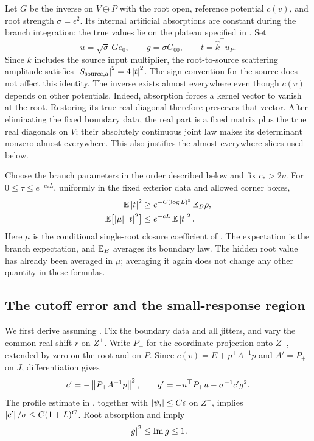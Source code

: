 Let $G$ be the inverse on $V\oplus P$ with the root open, reference
potential $c(v)$, and root strength $\sigma=\epsilon^2$. Its internal
artificial absorptions are constant during the branch integration:
the true values lie on the plateau specified in .
Set
\begin{equation}
 u=\sqrt\sigma\,Ge_0,\qquad g=\sigma G_{00},\qquad
 t=\widehat k^\top u_P.
 \label{trans:amplitude}
\end{equation}
Since $k$ includes the source input multiplier, the root-to-source
scattering amplitude satisfies $\left\lvert S_{\mathrm{source},a}\right\rvert^2=4\left\lvert t\right\rvert^2$.
The sign convention for the source does not affect this identity.
The inverse exists almost everywhere even though $c(v)$ depends on
other potentials. Indeed,
absorption forces a kernel vector to vanish at the root. Restoring its
true real diagonal therefore preserves that vector. After eliminating
the fixed boundary data, the real part is a fixed matrix plus the true
real diagonals on $V$; their absolutely continuous joint law makes its
determinant nonzero almost everywhere. This also justifies the
almost-everywhere slices used below.

\begin{proposition}\label{trans:cell}
Choose the branch parameters in the order described below and fix
$c_*>2\nu$. For $0\le\tau\le e^{-c_*L}$, uniformly in the fixed exterior
data and allowed corner boxes,
\begin{align}
 \mathbb E\left\lvert t\right\rvert^2
 &\ge e^{-C(\log L)^2}\,\mathbb E_B\rho,
 \label{trans:lower}\\
 \mathbb E\bigl[\left\lvert\mu\right\rvert\,\left\lvert t\right\rvert^2\bigr]
 &\le e^{-cL}\,\mathbb E\left\lvert t\right\rvert^2.
 \label{trans:relative}
\end{align}
Here $\mu$ is the conditional single-root closure coefficient of
. The expectation is the branch expectation,
and $\mathbb E_B$ averages its boundary law. The hidden root value has already
been averaged in $\mu$; averaging it again does not change any other
quantity in these formulas.
\end{proposition}

\subsection{The cutoff error and the small-response region}

We first derive  assuming .
Fix the boundary data and all jitters, and vary the common real shift
$r$ on $Z^+$. Write $P_+$ for the coordinate projection onto $Z^+$,
extended by zero on the root and on $P$. Since
$c(v)=E+p^\top A^{-1}p$ and $A'=P_+$ on $J$, differentiation gives
\begin{equation}
 c'=-\left\lVert P_+A^{-1}p\right\rVert^2,\qquad
 g'=-u^\top P_+u-\sigma^{-1}c'g^2.
 \label{trans:shift-derivatives}
\end{equation}
The profile estimate in , together with
$\left\lvert\psi_i\right\rvert\le C\epsilon$ on $Z^+$, implies
$\left\lvert c'\right\rvert/\sigma\le C(1+L)^C$. Root absorption and
 imply
\begin{equation}
 \left\lvert g\right\rvert^2\le\operatorname{Im}g\le1.
 \label{trans:g-ward}
\end{equation}

